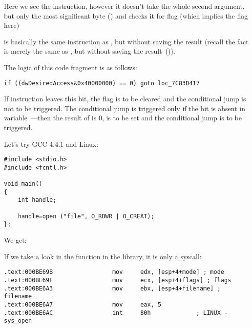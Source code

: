 
Here we see the \TEST instruction, however it doesn't take the whole second argument,
but only the most significant byte () and checks it for flag 
(which implies the  flag here)

\TEST is basically the same instruction as \AND, but without saving the result
(recall the fact \CMP is merely the same as \SUB, but without saving the result~()).

The logic of this code fragment is as follows:

\begin{lstlisting}
if ((dwDesiredAccess&0x40000000) == 0) goto loc_7C83D417
\end{lstlisting}


If \AND instruction leaves this bit, the \ZF flag is to be cleared and the 
\JZ conditional jump is not to be triggered.
The conditional jump is triggered only if the  bit is absent in  variable~---then the result of \AND is 0,
\ZF is to be set and the conditional jump is to be triggered.

Let's try GCC 4.4.1 and Linux:

\begin{lstlisting}
#include <stdio.h>
#include <fcntl.h>

void main()
{
	int handle;

	handle=open ("file", O_RDWR | O_CREAT);
};
\end{lstlisting}

We get:




If we take a look in the  function in the  library, it is only a syscall:

\begin{lstlisting}[caption=open() (libc.so.6)]
.text:000BE69B                 mov     edx, [esp+4+mode] ; mode
.text:000BE69F                 mov     ecx, [esp+4+flags] ; flags
.text:000BE6A3                 mov     ebx, [esp+4+filename] ; filename
.text:000BE6A7                 mov     eax, 5
.text:000BE6AC                 int     80h             ; LINUX - sys_open
\end{lstlisting}


